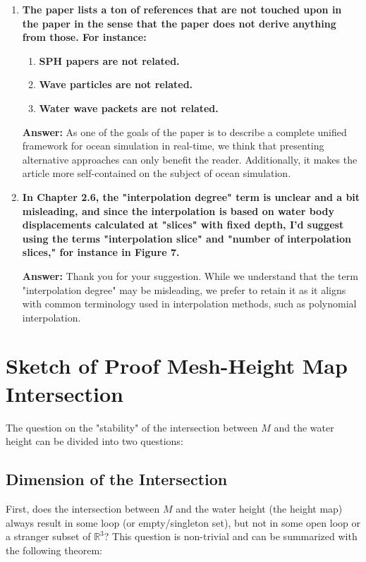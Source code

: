 \documentclass{article}
\newcommand{\answer}[1]{\textbf{\textcolor{answercolor}{Answer:}} \textcolor{answercolor}{#1}}
\begin{document}
\begin{enumerate}[label=\textbf{\arabic*.}]
	\item \textbf{The paper lists a ton of references that are not touched upon in the paper in the sense that the paper does not derive anything from those. For instance:}

	      \begin{enumerate}[label=\textbf{\arabic*.}]
		      \item \textbf{SPH papers are not related.}
		      \item \textbf{Wave particles are not related.}
		      \item \textbf{Water wave packets are not related.}
	      \end{enumerate}

	      \answer{As one of the goals of the paper is to describe a complete unified framework for ocean simulation in real-time, we think that presenting alternative approaches can only benefit the reader. Additionally, it makes the article more self-contained on the subject of ocean simulation.}

	\item \textbf{In Chapter 2.6, the "interpolation degree" term is unclear and a bit misleading, and since the interpolation is based on water body displacements calculated at "slices" with fixed depth, I'd suggest using the terms "interpolation slice" and "number of interpolation slices," for instance in Figure 7.}

	      \answer{Thank you for your suggestion. While we understand that the term "interpolation degree" may be misleading, we prefer to retain it as it aligns with common terminology used in interpolation methods, such as polynomial interpolation.}
\end{enumerate}

\appendix

\section{Sketch of Proof Mesh-Height Map Intersection}
\label{sec:sketch_of_proof}

The question on the "stability" of the intersection between $M$ and the water height can be divided into two questions:

\subsection{Dimension of the Intersection}

First, does the intersection between $M$ and the water height (the height map) always result in some loop (or empty/singleton set), but not in some open loop or a stranger subset of $\mathbb{R}^3$? This question is non-trivial and can be summarized with the following theorem:
\end{document}
